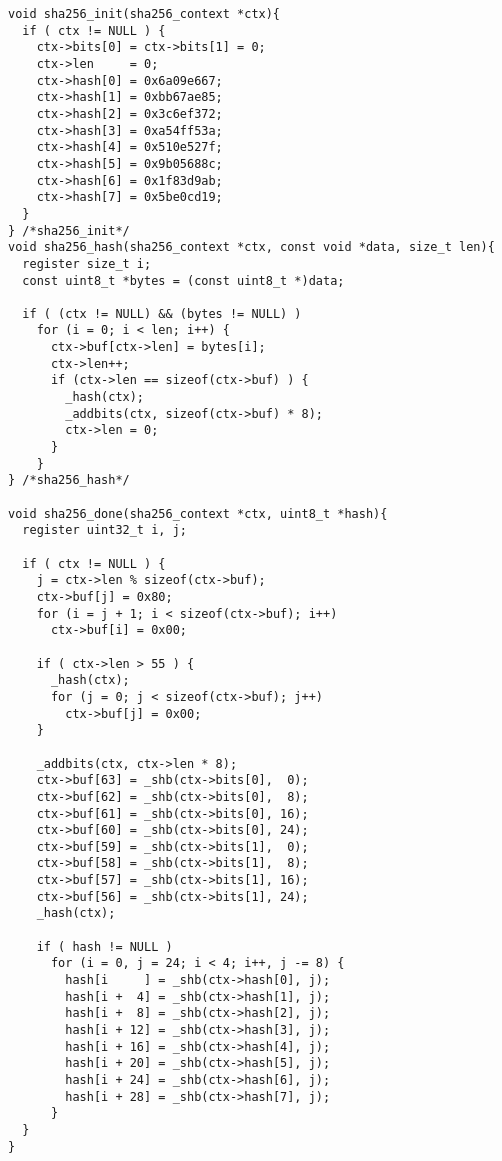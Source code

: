 \documentclass{thesis}
\begin{document}
\begin{lstlisting}
void sha256_init(sha256_context *ctx){
  if ( ctx != NULL ) {
    ctx->bits[0] = ctx->bits[1] = 0;
    ctx->len     = 0;
    ctx->hash[0] = 0x6a09e667;
    ctx->hash[1] = 0xbb67ae85;
    ctx->hash[2] = 0x3c6ef372;
    ctx->hash[3] = 0xa54ff53a;
    ctx->hash[4] = 0x510e527f;
    ctx->hash[5] = 0x9b05688c;
    ctx->hash[6] = 0x1f83d9ab;
    ctx->hash[7] = 0x5be0cd19;
  }
} /*sha256_init*/
void sha256_hash(sha256_context *ctx, const void *data, size_t len){
  register size_t i;
  const uint8_t *bytes = (const uint8_t *)data;

  if ( (ctx != NULL) && (bytes != NULL) )
    for (i = 0; i < len; i++) {
      ctx->buf[ctx->len] = bytes[i];
      ctx->len++;
      if (ctx->len == sizeof(ctx->buf) ) {
        _hash(ctx);
        _addbits(ctx, sizeof(ctx->buf) * 8);
        ctx->len = 0;
      }
    }
} /*sha256_hash*/

void sha256_done(sha256_context *ctx, uint8_t *hash){
  register uint32_t i, j;

  if ( ctx != NULL ) {
    j = ctx->len % sizeof(ctx->buf);
    ctx->buf[j] = 0x80;
    for (i = j + 1; i < sizeof(ctx->buf); i++)
      ctx->buf[i] = 0x00;

    if ( ctx->len > 55 ) {
      _hash(ctx);
      for (j = 0; j < sizeof(ctx->buf); j++)
        ctx->buf[j] = 0x00;
    }

    _addbits(ctx, ctx->len * 8);
    ctx->buf[63] = _shb(ctx->bits[0],  0);
    ctx->buf[62] = _shb(ctx->bits[0],  8);
    ctx->buf[61] = _shb(ctx->bits[0], 16);
    ctx->buf[60] = _shb(ctx->bits[0], 24);
    ctx->buf[59] = _shb(ctx->bits[1],  0);
    ctx->buf[58] = _shb(ctx->bits[1],  8);
    ctx->buf[57] = _shb(ctx->bits[1], 16);
    ctx->buf[56] = _shb(ctx->bits[1], 24);
    _hash(ctx);

    if ( hash != NULL )
      for (i = 0, j = 24; i < 4; i++, j -= 8) {
        hash[i     ] = _shb(ctx->hash[0], j);
        hash[i +  4] = _shb(ctx->hash[1], j);
        hash[i +  8] = _shb(ctx->hash[2], j);
        hash[i + 12] = _shb(ctx->hash[3], j);
        hash[i + 16] = _shb(ctx->hash[4], j);
        hash[i + 20] = _shb(ctx->hash[5], j);
        hash[i + 24] = _shb(ctx->hash[6], j);
        hash[i + 28] = _shb(ctx->hash[7], j);
      }
  }
}
\end{lstlisting}

\newpage
\end{document}
